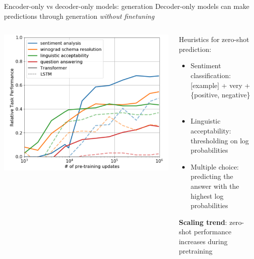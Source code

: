 \documentclass[usenames,dvipsnames,notes,11pt,aspectratio=169,hyperref={colorlinks=true, linkcolor=blue}]{beamer}
\begin{document}
\begin{frame}
    {Encoder-only vs decoder-only models: generation}
    Decoder-only models can make predictions through generation {\em without finetuning}

    \vspace{1em}
    \pause
    \begin{columns}
        \begin{column}{0.4\textwidth}
        \includegraphics[width=\textwidth]{figures/gpt1-zs}
        \end{column}
        \begin{column}{0.6\textwidth}
            Heuristics for zero-shot prediction:
            \begin{itemize}
                \item Sentiment classification: [example] + very + \{positive, negative\} $\quad$ 
                \item Linguistic acceptability: thresholding on log probabilities
                \item Multiple choice: predicting the answer with the highest log probabilities
            \end{itemize}
            \textbf{Scaling trend}: zero-shot performance increases during pretraining
        \end{column}
    \end{columns}
\end{frame}
\end{document}

